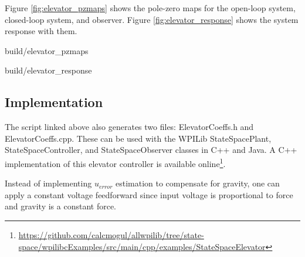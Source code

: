 Figure \ref{fig:elevator_pzmaps} shows the pole-zero maps for the open-loop
\gls{system}, closed-loop \gls{system}, and \gls{observer}. Figure
\ref{fig:elevator_response} shows the \gls{system} response with them.

\begin{svg}{build/elevator_pzmaps}
  \caption{Elevator pole-zero maps}
  \label{fig:elevator_pzmaps}
\end{svg}

\begin{svg}{build/elevator_response}
  \caption{Elevator response}
  \label{fig:elevator_response}
\end{svg}

\subsection{Implementation}

The script linked above also generates two files: ElevatorCoeffs.h and
ElevatorCoeffs.cpp. These can be used with the WPILib StateSpacePlant,
StateSpaceController, and StateSpaceObserver classes in C++ and Java. A C++
implementation of this elevator controller is available online\footnote{
\url{https://github.com/calcmogul/allwpilib/tree/state-space/wpilibcExamples/src/main/cpp/examples/StateSpaceElevator}}.

\begin{remark}
  Instead of implementing $u_{error}$ estimation to compensate for gravity, one
  can apply a constant voltage feedforward since input voltage is proportional
  to force and gravity is a constant force.
\end{remark}
